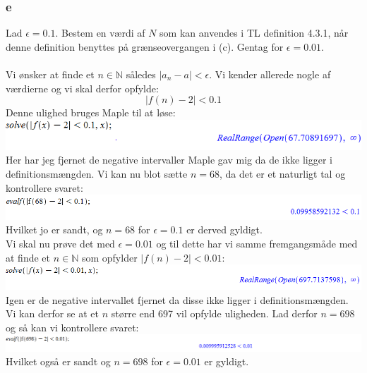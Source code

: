 \documentclass[12pt]{article}
\begin{document}
\subsubsection*{e}
Lad $\epsilon=0.1$. Bestem en værdi af $N$ som kan anvendes i TL definition 4.3.1, når denne definition benyttes på grænseovergangen i (c). Gentag for $\epsilon=0.01$.\\
\\
Vi ønsker at finde et $n\in \mathbb{N}$ således $|a_n-a|<\epsilon$. Vi kender allerede nogle af værdierne og vi skal derfor opfylde:
$$|f(n)-2|<0.1$$
Denne ulighed bruges Maple til at løse:\\
\includegraphics[scale=0.6]{Pic6}\\
Her har jeg fjernet de negative intervaller Maple gav mig da de ikke ligger i definitionsmængden. Vi kan nu blot sætte $n=68$, da det er et naturligt tal og kontrollere svaret:\\
\includegraphics[scale=0.6]{Pic7}\\
Hvilket jo er sandt, og $n=68$ for $\epsilon=0.1$ er derved gyldigt.\\
Vi skal nu prøve det med $\epsilon=0.01$ og til dette har vi samme fremgangsmåde med at finde et $n\in \mathbb{N}$ som opfylder $|f(n)-2|<0.01$:\\
\includegraphics[scale=0.6]{Pic8}\\
Igen er de negative intervallet fjernet da disse ikke ligger i definitionsmængden. Vi kan derfor se at et $n$ større end 697 vil opfylde uligheden. Lad derfor $n=698$ og så kan vi kontrollere svaret:\\
\includegraphics[scale=0.6]{Pic9}\\
Hvilket også er sandt og $n=698$ for $\epsilon=0.01$ er gyldigt.
\end{document}
